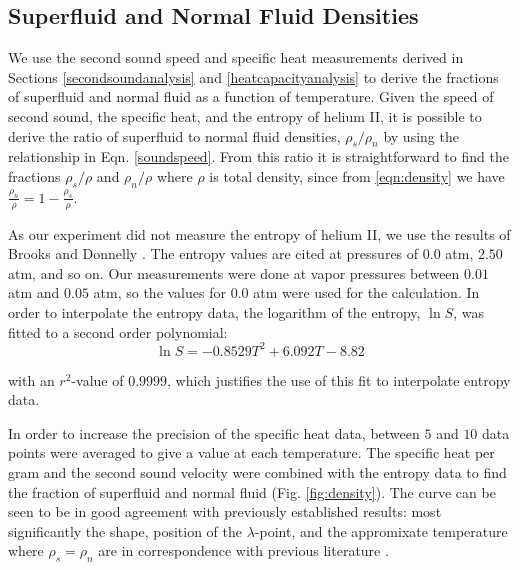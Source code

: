 \subsection{Superfluid and Normal Fluid Densities}\label{superfluiddensity}


We use the second sound speed and specific heat measurements derived
in Sections \ref{secondsoundanalysis} and \ref{heatcapacityanalysis}
to derive the fractions of superfluid and normal fluid as a function
of temperature. Given the speed of second sound, the specific heat,
and the entropy of helium II, it is possible to derive the ratio of
superfluid to normal fluid densities, $\rho_s/\rho_n$ by using the
relationship in Eqn. \ref{soundspeed}. From this ratio it is
straightforward to find the fractions $\rho_s/\rho$ and $\rho_n/\rho$
where $\rho$ is total density, since from \ref{eqn:density} we have
$\frac{\rho_n}{\rho} = 1 - \frac{\rho_s}{\rho}$.

As our experiment did not measure the entropy of helium II, we use the
results of Brooks and Donnelly \cite{brooks}. The entropy
values are cited at pressures of $0.0$ atm, $2.50$ atm, and so on. Our
measurements were done at vapor pressures between $0.01$ atm and
$0.05$ atm, so the values for $0.0$ atm were used for the calculation.
In order to interpolate the entropy data, the logarithm of the
entropy, $\ln S$, was fitted to a second order polynomial:
\begin{equation}
\ln S = -0.8529T^2 + 6.092T - 8.82
\end{equation}

with an $r^2$-value of $0.9999$, which justifies the use of this fit
to interpolate entropy data.

In order to increase the precision of the specific heat data, between
$5$ and $10$ data points were averaged to give a value at each
temperature. The specific heat per gram 
and  the second sound velocity were combined with the entropy data to
find the fraction of superfluid and normal fluid
(Fig. \ref{fig:density}). The curve can be seen to be in good agreement with
previously established results: most significantly the shape, position
of the $\lambda$-point, and the appromixate temperature where $\rho_s
= \rho_n$ are in correspondence with previous literature \cite{andro}.

